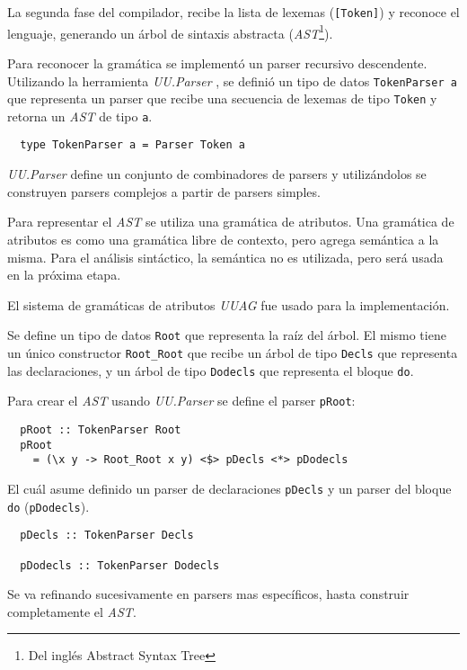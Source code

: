  La segunda fase del compilador, recibe la lista de lexemas (\texttt{[Token]}) y
reconoce el lenguaje, generando un árbol de
sintaxis abstracta (\emph{AST}\footnote{Del inglés Abstract Syntax Tree}).

  Para reconocer la gramática se implementó un parser recursivo descendente.
  Utilizando la herramienta \textit{UU.Parser} \cite{uuparser}, se definió un tipo de datos
  \texttt{TokenParser a} que representa un parser que recibe una secuencia de lexemas de tipo \texttt{Token}
  y retorna un \emph{AST} de tipo \texttt{a}.

  \begin{Verbatim}
  type TokenParser a = Parser Token a
  \end{Verbatim}

  \textit{UU.Parser} define un conjunto de combinadores de parsers y utilizándolos se construyen parsers
  complejos a partir de parsers simples.

  Para representar el \emph{AST} se utiliza una gramática de atributos.
  Una gramática de atributos es como una gramática libre de contexto, pero agrega semántica a la misma.
  Para el análisis sintáctico, la semántica no es utilizada, pero será usada en la próxima etapa.

  El sistema de gramáticas de atributos
  \textit{UUAG}\cite{uuag} fue usado para la implementación.

  Se define un tipo de datos \texttt{Root} que representa la raíz del árbol.
  El mismo tiene un único constructor \texttt{Root\_Root} que recibe un árbol de tipo
  \texttt{Decls} que representa las declaraciones, y un árbol de tipo \texttt{Dodecls} que
  representa el bloque \texttt{do}.

  Para crear el \emph{AST} usando \textit{UU.Parser} se define el parser \texttt{pRoot}:

  \begin{Verbatim}
  pRoot :: TokenParser Root
  pRoot
    = (\x y -> Root_Root x y) <$> pDecls <*> pDodecls
  \end{Verbatim}

  El cuál asume definido un parser de declaraciones \texttt{pDecls} y un parser
  del bloque \texttt{do} (\texttt{pDodecls}).

  \begin{Verbatim}
  pDecls :: TokenParser Decls

  pDodecls :: TokenParser Dodecls
  \end{Verbatim}

  Se va refinando sucesivamente en parsers mas específicos, hasta construir completamente el \emph{AST}.


